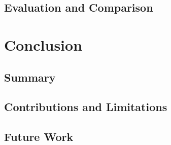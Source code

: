 \documentclass[12pt,a4paper]{article}
\begin{document}
\subsection{Evaluation and Comparison}





%
%
%
%
%
%
%
%
\newpage
\section{Conclusion} \label{section:conclusion}


\subsection{Summary}


\subsection{Contributions and Limitations}


\subsection{Future Work}





%
%
%
%
%
%
%
%
	
	
	
	
	\newpage
	\begin{spacing}{0.9}
		\printbibliography
	\end{spacing}
	
	
	
	
	
	
	
	
\end{document}
